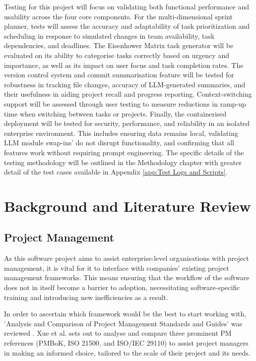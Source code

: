 \documentclass{report}
\begin{document}
Testing for this project will focus on validating both functional performance and usability across the four core components. For the multi-dimensional sprint planner, tests will assess the accuracy and adaptability of task prioritization and scheduling in response to simulated changes in team availability, task dependencies, and deadlines. The Eisenhower Matrix task generator will be evaluated on its ability to categorise tasks correctly based on urgency and importance, as well as its impact on user focus and task completion rates.
The version control system and commit summarisation feature will be tested for robustness in tracking file changes, accuracy of LLM-generated summaries, and their usefulness in aiding project recall and progress reporting. Context-switching support will be assessed through user testing to measure reductions in ramp-up time when switching between tasks or projects.
Finally, the containerised deployment will be tested for security, performance, and reliability in an isolated enterprise environment. This includes ensuring data remains local, validating LLM module swap-ins' do not disrupt functionality, and confirming that all features work without requiring prompt engineering. The specific details of the testing methodology will be outlined in the Methodology chapter with greater detail of the test cases available in Appendix \ref{app:Test Logs and Scripts}.

\chapter{Background and Literature Review}  %
\section{Project Management}

As this software project aims to assist enterprise-level organisations with project management, it is vital for it to interface with companies' existing project management frameworks. This means ensuring that the workflow of the software does not in itself become a barrier to adoption, necessitating software-specific training and introducing new inefficiencies as a result.

In order to ascertain which framework would be the best to start working with, 'Analysis and Comparison of Project Management Standards and Guides' was reviewed \parencite{xueAnalysisComparisonProject}. Xue et al. sets out to analyse and compare three prominent PM references (PMBoK, ISO 21500, and ISO/IEC 29110) to assist project managers in making an informed choice, tailored to the scale of their project and its needs.
\end{document}
